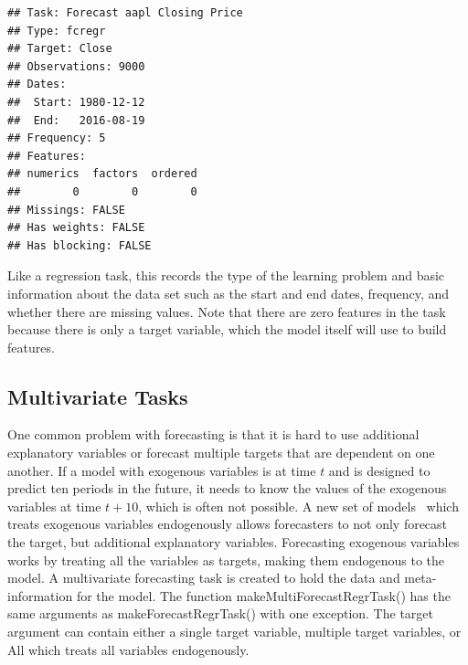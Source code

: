 \documentclass[12pt]{article}%
\makeatletter
\theoremstyle{definition}
\newcommand\code{\@codex}
\def\@codex#1{{\normalfont\ttfamily\hyphenchar\font=-1 #1}}
\makeatother
\begin{document}
\singlespacing
\begin{knitrout}
\color{fgcolor}\begin{kframe}
\begin{alltt}
 \hlkwb{<-} \hlstd{(}
   \hlstd{=} \hlstd{,}
   
    \hlstd{=} \hlstd{,}
   \hlstd{=} \hlstd{)}
\end{alltt}
\begin{verbatim}
## Task: Forecast aapl Closing Price
## Type: fcregr
## Target: Close
## Observations: 9000
## Dates:
##  Start: 1980-12-12 
##  End:   2016-08-19
## Frequency: 5
## Features:
## numerics  factors  ordered 
##        0        0        0 
## Missings: FALSE
## Has weights: FALSE
## Has blocking: FALSE
\end{verbatim}
\end{kframe}
\end{knitrout}
\doublespacing
Like a regression task, this records the type of the learning problem and basic information about the data set such as the start and end dates, frequency, and whether there are missing values. Note that there are zero features in the task because there is only a target variable, which the model itself will use to build features.

\subsection{Multivariate Tasks}
\label{sec:multivarTask}

One common problem with forecasting is that it is hard to use additional explanatory variables or forecast multiple targets that are dependent on one another. If a model with exogenous variables is at time $t$ and is designed to predict ten periods in the future, it needs to know the values of the exogenous variables at time $t+10$, which is often not possible. A new set of models~\cite{BigVAR} which treats exogenous variables endogenously allows forecasters to not only forecast the target, but additional explanatory variables. Forecasting exogenous variables works by treating all the variables as targets, making them endogenous to the model. A multivariate forecasting task is created to hold the data and meta-information for the model. The function \code{makeMultiForecastRegrTask()} has the same arguments as \code{makeForecastRegrTask()} with one exception. The \code{target} argument can contain either a single target variable, multiple target variables, or \code{All} which treats all variables endogenously.
\end{document}
